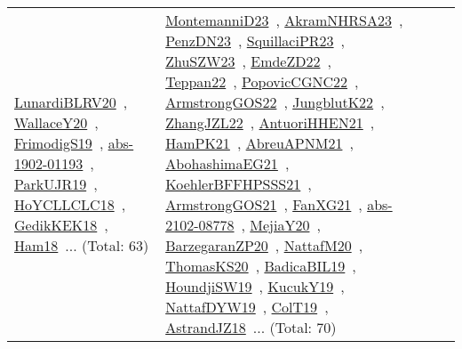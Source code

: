 {\begin{longtable}{lp{3cm}>{\raggedright\arraybackslash}p{6cm}>{\raggedright\arraybackslash}p{6cm}>{\raggedright\arraybackslash}p{8cm}}
\href{works/LunardiBLRV20.pdf}{LunardiBLRV20}~\cite{LunardiBLRV20}, \href{works/WallaceY20.pdf}{WallaceY20}~\cite{WallaceY20}, \href{works/FrimodigS19.pdf}{FrimodigS19}~\cite{FrimodigS19}, \href{works/abs-1902-01193.pdf}{abs-1902-01193}~\cite{abs-1902-01193}, \href{works/ParkUJR19.pdf}{ParkUJR19}~\cite{ParkUJR19}, \href{works/HoYCLLCLC18.pdf}{HoYCLLCLC18}~\cite{HoYCLLCLC18}, \href{works/GedikKEK18.pdf}{GedikKEK18}~\cite{GedikKEK18}, \href{works/Ham18.pdf}{Ham18}~\cite{Ham18}... (Total: 63) & \href{works/MontemanniD23.pdf}{MontemanniD23}~\cite{MontemanniD23}, \href{works/AkramNHRSA23.pdf}{AkramNHRSA23}~\cite{AkramNHRSA23}, \href{works/PenzDN23.pdf}{PenzDN23}~\cite{PenzDN23}, \href{works/SquillaciPR23.pdf}{SquillaciPR23}~\cite{SquillaciPR23}, \href{works/ZhuSZW23.pdf}{ZhuSZW23}~\cite{ZhuSZW23}, \href{works/EmdeZD22.pdf}{EmdeZD22}~\cite{EmdeZD22}, \href{works/Teppan22.pdf}{Teppan22}~\cite{Teppan22}, \href{works/PopovicCGNC22.pdf}{PopovicCGNC22}~\cite{PopovicCGNC22}, \href{works/ArmstrongGOS22.pdf}{ArmstrongGOS22}~\cite{ArmstrongGOS22}, \href{works/JungblutK22.pdf}{JungblutK22}~\cite{JungblutK22}, \href{works/ZhangJZL22.pdf}{ZhangJZL22}~\cite{ZhangJZL22}, \href{works/AntuoriHHEN21.pdf}{AntuoriHHEN21}~\cite{AntuoriHHEN21}, \href{works/HamPK21.pdf}{HamPK21}~\cite{HamPK21}, \href{works/AbreuAPNM21.pdf}{AbreuAPNM21}~\cite{AbreuAPNM21}, \href{works/AbohashimaEG21.pdf}{AbohashimaEG21}~\cite{AbohashimaEG21}, \href{works/KoehlerBFFHPSSS21.pdf}{KoehlerBFFHPSSS21}~\cite{KoehlerBFFHPSSS21}, \href{works/ArmstrongGOS21.pdf}{ArmstrongGOS21}~\cite{ArmstrongGOS21}, \href{works/FanXG21.pdf}{FanXG21}~\cite{FanXG21}, \href{works/abs-2102-08778.pdf}{abs-2102-08778}~\cite{abs-2102-08778}, \href{works/MejiaY20.pdf}{MejiaY20}~\cite{MejiaY20}, \href{works/BarzegaranZP20.pdf}{BarzegaranZP20}~\cite{BarzegaranZP20}, \href{works/NattafM20.pdf}{NattafM20}~\cite{NattafM20}, \href{works/ThomasKS20.pdf}{ThomasKS20}~\cite{ThomasKS20}, \href{works/BadicaBIL19.pdf}{BadicaBIL19}~\cite{BadicaBIL19}, \href{works/HoundjiSW19.pdf}{HoundjiSW19}~\cite{HoundjiSW19}, \href{works/KucukY19.pdf}{KucukY19}~\cite{KucukY19}, \href{works/NattafDYW19.pdf}{NattafDYW19}~\cite{NattafDYW19}, \href{works/ColT19.pdf}{ColT19}~\cite{ColT19}, \href{works/AstrandJZ18.pdf}{AstrandJZ18}~\cite{AstrandJZ18}... (Total: 70)\\

\end{longtable}}
